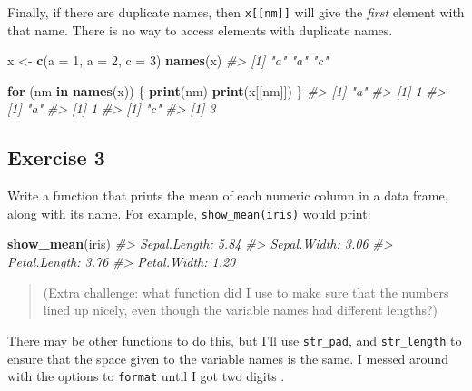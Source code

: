 \documentclass[]{book}
\newenvironment{Shaded}{\begin{snugshade}}{\end{snugshade}}
\newcommand{\CommentTok}[1]{\textcolor[rgb]{0.56,0.35,0.01}{\textit{#1}}}
\newcommand{\ControlFlowTok}[1]{\textcolor[rgb]{0.13,0.29,0.53}{\textbf{#1}}}
\newcommand{\DataTypeTok}[1]{\textcolor[rgb]{0.13,0.29,0.53}{#1}}
\newcommand{\DecValTok}[1]{\textcolor[rgb]{0.00,0.00,0.81}{#1}}
\newcommand{\KeywordTok}[1]{\textcolor[rgb]{0.13,0.29,0.53}{\textbf{#1}}}
\newcommand{\NormalTok}[1]{#1}
\newcommand{\StringTok}[1]{\textcolor[rgb]{0.31,0.60,0.02}{#1}}
\theoremstyle{definition}
\theoremstyle{definition}
\theoremstyle{definition}
\theoremstyle{remark}
\begin{document}
Finally, if there are duplicate names, then \texttt{x{[}{[}nm{]}{]}}
will give the \emph{first} element with that name. There is no way to
access elements with duplicate names.

\begin{Shaded}
\begin{Highlighting}[]
\NormalTok{x <-}\StringTok{ }\KeywordTok{c}\NormalTok{(}\DataTypeTok{a =} \DecValTok{1}\NormalTok{, }\DataTypeTok{a =} \DecValTok{2}\NormalTok{, }\DataTypeTok{c =} \DecValTok{3}\NormalTok{)}
\KeywordTok{names}\NormalTok{(x)}
\CommentTok{#> [1] "a" "a" "c"}
\end{Highlighting}
\end{Shaded}

\begin{Shaded}
\begin{Highlighting}[]
\ControlFlowTok{for}\NormalTok{ (nm }\ControlFlowTok{in} \KeywordTok{names}\NormalTok{(x)) \{}
  \KeywordTok{print}\NormalTok{(nm)}
  \KeywordTok{print}\NormalTok{(x[[nm]])}
\NormalTok{\}}
\CommentTok{#> [1] "a"}
\CommentTok{#> [1] 1}
\CommentTok{#> [1] "a"}
\CommentTok{#> [1] 1}
\CommentTok{#> [1] "c"}
\CommentTok{#> [1] 3}
\end{Highlighting}
\end{Shaded}

\hypertarget{exercise-3-39}{%
\subsection{Exercise 3}\label{exercise-3-39}}

Write a function that prints the mean of each numeric column in a data
frame, along with its name. For example, \texttt{show\_mean(iris)} would
print:

\begin{Shaded}
\begin{Highlighting}[]
\KeywordTok{show_mean}\NormalTok{(iris)}
\CommentTok{#> Sepal.Length: 5.84}
\CommentTok{#> Sepal.Width:  3.06}
\CommentTok{#> Petal.Length: 3.76}
\CommentTok{#> Petal.Width:  1.20}
\end{Highlighting}
\end{Shaded}

\begin{quote}
(Extra challenge: what function did I use to make sure that the numbers
lined up nicely, even though the variable names had different lengths?)
\end{quote}

There may be other functions to do this, but I'll use \texttt{str\_pad},
and \texttt{str\_length} to ensure that the space given to the variable
names is the same. I messed around with the options to \texttt{format}
until I got two digits .
\end{document}

